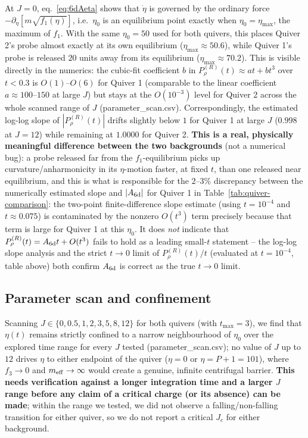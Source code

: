 \documentclass[11pt]{article}
\begin{document}
At $J=0$, eq.~\eqref{eq:6dAeta} shows that $\dot\eta$ is governed by the ordinary force $-\partial_\eta\!\left[m\sqrt{f_1(\eta)}\right]$, i.e.\ $\eta_0$ is an equilibrium point exactly when $\eta_0=\eta_{\max}$, the maximum of $f_1$. With the same $\eta_0=50$ used for both quivers, this places Quiver 2's probe almost exactly at its own equilibrium ($\eta_{\max}\approx50.6$), while Quiver 1's probe is released $20$ units away from its equilibrium ($\eta_{\max}\approx70.2$). This is visible directly in the numerics: the cubic-fit coefficient $b$ in $P_\rho^{(R)}(t)\approx at+bt^3$ over $t<0.3$ is $O(1)$--$O(6)$ for Quiver 1 (comparable to the linear coefficient $a\approx100$--$150$ at large $J$) but stays at the $O(10^{-3})$ level for Quiver 2 across the whole scanned range of $J$ (parameter\_scan.csv). Correspondingly, the estimated log-log slope of $|P_\rho^{(R)}(t)|$ drifts slightly below $1$ for Quiver 1 at large $J$ ($0.998$ at $J=12$) while remaining at $1.0000$ for Quiver 2. \textbf{This is a real, physically meaningful difference between the two backgrounds} (not a numerical bug): a probe released far from the $f_1$-equilibrium picks up curvature/anharmonicity in its $\eta$-motion faster, at fixed $t$, than one released near equilibrium, and this is what is responsible for the $2$--$3\%$ discrepancy between the numerically estimated slope and $|A_{\rm 6d}|$ for Quiver 1 in Table~\ref{tab:quiver-comparison}: the two-point finite-difference slope estimate (using $t=10^{-4}$ and $t\approx0.075$) is contaminated by the nonzero $O(t^3)$ term precisely because that term is large for Quiver 1 at this $\eta_0$. It does \emph{not} indicate that $P_\rho^{(R)}(t)=A_{\rm 6d}t+O(t^3)$ fails to hold as a leading small-$t$ statement -- the log-log slope analysis and the strict $t\to0$ limit of $P_\rho^{(R)}(t)/t$ (evaluated at $t=10^{-4}$, table above) both confirm $A_{\rm 6d}$ is correct as the true $t\to0$ limit.

\subsection{Parameter scan and confinement}

Scanning $J\in\{0,0.5,1,2,3,5,8,12\}$ for both quivers (with $t_{\max}=3$), we find that $\eta(t)$ remains strictly confined to a narrow neighbourhood of $\eta_0$ over the explored time range for every $J$ tested (parameter\_scan.csv); no value of $J$ up to $12$ drives $\eta$ to either endpoint of the quiver ($\eta=0$ or $\eta=P+1=101$), where $f_3\to0$ and $m_{\rm eff}\to\infty$ would create a genuine, infinite centrifugal barrier. \textbf{This needs verification against a longer integration time and a larger $J$ range before any claim of a critical charge (or its absence) can be made}; within the range we tested, we did not observe a falling/non-falling transition for either quiver, so we do not report a critical $J_c$ for either background.
\end{document}
